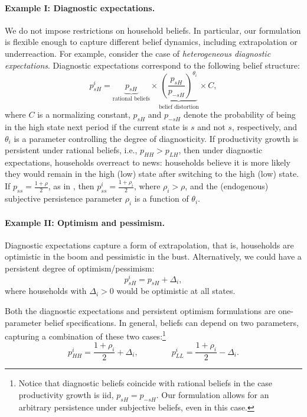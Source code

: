 \paragraph{Example I: Diagnostic expectations.} We do not impose restrictions on household beliefs. 
In particular, our formulation is flexible enough to capture different belief dynamics, including extrapolation or underreaction. 
For example, consider the case of \textit{heterogeneous diagnostic expectations}. 
Diagnostic expectations correspond to the following belief structure:
\begin{equation}
    p_{sH}^i = \underbrace{p_{sH}}_{\text{rational beliefs}} \times \underbrace{\left( \frac{p_{sH}}{p_{-sH}} \right)^{\theta_i}}_{\text{belief distortion}} \times C,\nonumber
\end{equation}
where $C$ is a normalizing constant, $p_{sH}$ and $p_{-sH}$ denote the probability of being in the high state next period if the current state is $s$ and not $s$, respectively, and $\theta_i$ is a parameter controlling the degree of diagnosticity.
If productivity growth is persistent under rational beliefs, i.e., $p_{HH} > p_{LH}$, then under diagnostic expectations, households overreact to news: households believe it is more likely they would remain in the high (low) state after switching to the high (low) state.
If $p_{ss} = \frac{1+\rho}{2}$, as in \citet{MP85}, then $p_{ss}^i = \frac{1+\rho_i}{2}$,  where $\rho_i > \rho$, and the (endogenous) subjective persistence parameter $\rho_i$ is a function of $\theta_i$.

\paragraph{Example II: Optimism and pessimism.}  Diagnostic expectations capture a form of extrapolation, that is, households are optimistic in the boom and pessimistic in the bust. 
Alternatively, we could have a persistent degree of optimism/pessimism:
\begin{equation}
    p_{sH}^i = p_{sH} + \Delta_i,\nonumber
\end{equation}
where households with $\Delta_i > 0$ would be optimistic at all states.

Both the diagnostic expectations and persistent optimism formulations are one-parameter belief specifications. 
In general, beliefs can depend on two parameters, capturing a combination of these two cases:\footnote{Notice that diagnostic beliefs coincide with rational beliefs in the case productivity growth is iid, $p_{sH} = p_{-sH}$. 
Our formulation allows for an arbitrary persistence under subjective beliefs, even in this case.
}
\begin{equation*}
    p_{HH}^i = \frac{1+\rho_i}{2}+\Delta_i, \qquad \qquad p_{LL}^i = \frac{1+\rho_i}{2} -\Delta_i.
\end{equation*}

